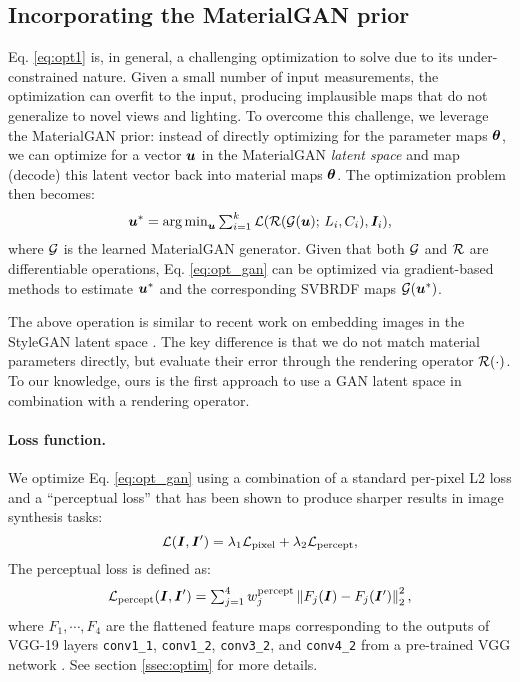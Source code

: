 \subsection{Incorporating the MaterialGAN prior}

Eq. \eqref{eq:opt1} is, in general, a challenging optimization to solve due to its under-constrained nature.
Given a small number of input measurements, the optimization can overfit to the input, producing implausible maps that do not generalize to novel views and lighting.
To overcome this challenge, we leverage the MaterialGAN prior: instead of directly optimizing for the parameter maps $\bm\theta$,  we can optimize for a vector $\bm{u}$ in the MaterialGAN \emph{latent space} and map (decode) this latent vector back into material maps $\bm\theta$.
The optimization problem then becomes:
\begin{equation}
	\label{eq:opt_gan}
	\bm{u}^* = \textstyle\operatorname*{arg\,min}_{\bm{u}} \sum_{i=1}^k \mathcal{L}(\mathcal{R}(\mathcal{G}(\bm{u}); \,L_i, C_i), \bm{I}_i),
\end{equation}
where $\mathcal{G}$ is the learned MaterialGAN generator.
Given that both $\mathcal{G}$ and $\mathcal{R}$ are differentiable operations, Eq. \eqref{eq:opt_gan} can be optimized via gradient-based methods to estimate $\bm{u}^*$ and the corresponding SVBRDF maps $\mathcal{G}(\bm{u}^*)$.

The above operation is similar to recent work on embedding images in the StyleGAN latent space \cite{abdal2019image2stylegan,abdal2020image2stylegan++}.
The key difference is that we do not match material parameters directly, but evaluate their error through the rendering operator $\mathcal{R}(\cdot)$.
To our knowledge, ours is the first approach to use a GAN latent space in combination with a rendering operator.


\paragraph{Loss function.}
We optimize Eq. \ref{eq:opt_gan} using a combination of a standard per-pixel L2 loss and a ``perceptual loss'' \cite{johnson2016perceptual} that has been shown to produce sharper results in image synthesis tasks:
\begin{equation}
	\label{eq:loss}
	\mathcal{L}(\bm{I}, \bm{I}') = \lambda_1 \mathcal{L}_\mathrm{pixel} + \lambda_2 \mathcal{L}_\mathrm{percept},
\end{equation}
The perceptual loss is defined as:
\begin{equation}
	\mathcal{L}_\mathrm{percept}(\bm{I}, \bm{I}') = \textstyle\sum_{j=1}^4 w^\mathrm{percept}_j \left\|F_j(\bm{I}) - F_j(\bm{I}')\right\|_2^2,
\end{equation}
where $F_1, \cdots, F_4$ are the flattened feature maps corresponding to the outputs of VGG-19 layers  \texttt{conv1\_1}, \texttt{conv1\_2}, \texttt{conv3\_2}, and \texttt{conv4\_2} from a pre-trained VGG network \cite{simonyan2014very}. See section \ref{ssec:optim} for more details.



